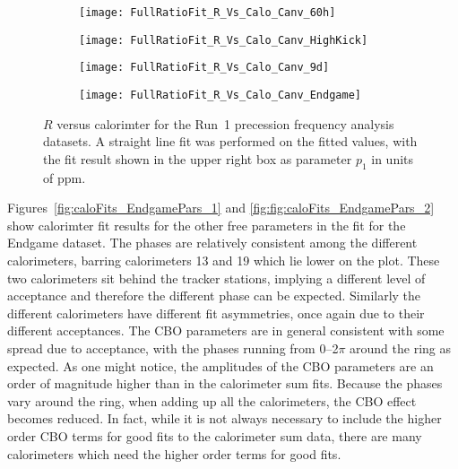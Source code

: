 \begin{figure}[]
\centering
    \begin{subfigure}[]{0.45\textwidth}
        \centering
        \texttt{[image: FullRatioFit\_R\_Vs\_Calo\_Canv\_60h]}
    \vspace{-10mm}
    \end{subfigure}%
    \begin{subfigure}[]{0.45\textwidth}
        \centering
        \texttt{[image: FullRatioFit\_R\_Vs\_Calo\_Canv\_HighKick]}
    \vspace{-10mm}
    \end{subfigure}

    \begin{subfigure}[]{0.45\textwidth}
        \centering
        \texttt{[image: FullRatioFit\_R\_Vs\_Calo\_Canv\_9d]}
    \vspace{-10mm}
    \end{subfigure}%
    \begin{subfigure}[]{0.45\textwidth}
        \centering
        \texttt{[image: FullRatioFit\_R\_Vs\_Calo\_Canv\_Endgame]}
    \vspace{-10mm}
    \end{subfigure}
\caption[$R$ versus calorimeter number]{$R$ versus calorimter for the Run~1 precession frequency analysis datasets. A straight line fit was performed on the fitted values, with the fit result shown in the upper right box as parameter $p_{1}$ in units of ppm.}
\label{fig:caloFits_R}
\end{figure}

\clearpage




Figures~\ref{fig:caloFits_EndgamePars_1} and \ref{fig:fig:caloFits_EndgamePars_2} show calorimter fit results for the other free parameters in the fit for the Endgame dataset. The \gmtwo phases are relatively consistent among the different calorimeters, barring calorimeters 13 and 19 which lie lower on the plot. These two calorimeters sit behind the tracker stations, implying a different level of acceptance and therefore the different \gmtwo phase can be expected. Similarly the different calorimeters have different fit asymmetries, once again due to their different acceptances. The CBO parameters are in general consistent with some spread due to acceptance, with the phases running from 0--2$\pi$ around the ring as expected. As one might notice, the amplitudes of the CBO parameters are an order of magnitude higher than in the calorimeter sum fits. Because the phases vary around the ring, when adding up all the calorimeters, the CBO effect becomes reduced. In fact, while it is not always necessary to include the higher order CBO terms for good fits to the calorimeter sum data, there are many calorimeters which need the higher order terms for good fits.



